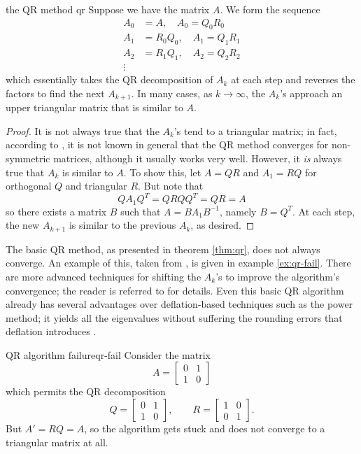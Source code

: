 \documentclass{article}
\begin{document}
\begin{theorem}{the QR method \cite[p.~530]{strang}}{qr}
  Suppose we have the matrix $A$. We form the sequence
  \begin{align*}
    A_0 &= A, \quad A_0 = Q_0R_0 \\
    A_1 &= R_0Q_0, \quad A_1 = Q_1R_1 \\
    A_2 &= R_1Q_1, \quad A_2 = Q_2R_2 \\
    \vdots
  \end{align*}
  which essentially takes the QR decomposition of $A_k$ at each step and reverses the factors to find the next $A_{k+1}$. In many cases, as $k \to \infty$, the $A_k$'s approach an upper triangular matrix that is similar to $A$.
\end{theorem}
\begin{proof}
  It is not always true that the $A_k$'s tend to a triangular matrix; in fact, according to \cite{cornell-qr}, it is not known in general that the QR method converges for non-symmetric matrices, although it usually works very well. However, it \emph{is} always true that $A_k$ is similar to $A$. To show this, let $A = QR$ and $A_1 = RQ$ for orthogonal $Q$ and triangular $R$. But note that
  \begin{equation*}
    QA_1Q^T = QRQQ^T = QR = A
  \end{equation*}
  so there exists a matrix $B$ such that $A = BA_1B^{-1}$, namely $B = Q^T$. At each step, the new $A_{k+1}$ is similar to the previous $A_k$, as desired.
\end{proof}

The basic QR method, as presented in theorem \ref{thm:qr}, does not always converge. An example of this, taken from \cite{cornell-qr}, is given in example \ref{ex:qr-fail}. There are more advanced techniques for shifting the $A_k$'s to improve the algorithm's convergence; the reader is referred to \cite[p.~530]{strang} for details. Even this basic QR algorithm already has several advantages over deflation-based techniques such as the power method; it yields all the eigenvalues without suffering the rounding errors that deflation introduces \cite{deflation-robots}.

\begin{example}{QR algorithm failure}{qr-fail}
  Consider the matrix
  \begin{equation*}
    A = \begin{bmatrix}0 & 1 \\ 1 & 0\end{bmatrix}
  \end{equation*}
  which permits the QR decomposition
  \begin{equation*}
    Q = \begin{bmatrix}0 & 1 \\ 1 & 0\end{bmatrix}, \quad\quad
    R = \begin{bmatrix}1 & 0 \\ 0 & 1\end{bmatrix}.
  \end{equation*}
  But $A' = RQ = A$, so the algorithm gets stuck and does not converge to a triangular matrix at all.
\end{example}
\end{document}
